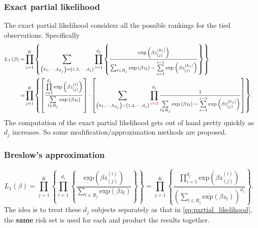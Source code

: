 \documentclass[a4paper,12pt]{article}
\begin{document}
\subsubsection{Exact partial likelihood}
\label{sec:exact-part-likel}

The exact partial likelihood considers all the possible rankings for the tied observations. Specifically
\begin{equation}
  \label{eq:exact_l1_with_ties}
  \footnotesize
  \begin{aligned}
    L_1\left(\beta\right)
    =& \prod\limits_{j = 1}^K
    \left\{
      \sum\limits_{
        \left(k_1, \cdots, k_{d_j}\right) = \left(1, 2, \cdots, d_j\right)
      }
      \prod\limits_{i = 1}^{d_j}\left\{
        \frac{
          \mathrm{exp}\left(\beta z_{\left(j\right)}^{\left(k_i\right)}\right)
        }{
          \sum_{l\in R_j}\mathrm{exp}\left(\beta z_l\right)
          - \sum\limits_{s = 1}^{i - 1}\mathrm{exp}\left(\beta z_{\left(j\right)}^{\left(k_s\right)}\right)
        }
      \right\}
    \right\}    \\
    =& \prod\limits_{j = 1}^{K}\left\{
      \left[
        \frac{
         \prod\limits_{i = 1}^{d_j}\mathrm{exp}\left(\beta z_{\left(j\right)}^{\left(i\right)}\right) 
       }{
         \sum\limits_{l\in R_j}\mathrm{exp}\left(\beta z_l\right)
       }        
     \right]
     \cdot
     \left[
       \sum\limits_{\left(k_1, \cdots, k_{d_j}\right) = \left(1, 2, \cdots, d_j\right)}
       \prod\limits_{{\color{red}i = 2}}^{d_j}\frac{1}{
         \sum\limits_{l\in R_j}\mathrm{exp}\left(\beta z_l\right)
         - \sum\limits_{s = 1}^{i - 1}
         \mathrm{exp}\left(\beta z_{\left(j\right)}^{\left(k_s\right)}\right)
       }
     \right]
    \right\}
    .
  \end{aligned}
\end{equation}
The computation of the exact partial likelihood gets out of hand pretty quickly as $d_j$ increases. So some modification/approximation methods are proposed.

\subsubsection{Breslow's approximation}
\label{sec:bresl-appr}

\begin{equation}
  \label{eq:breslow_l1}
  L_1\left(\beta\right) =
  \prod\limits_{j = 1}^K\left\{
    \prod\limits_{i = 1}^{d_j}\left\{
      \frac{\mathrm{exp}\left(\beta z_{\left(j\right)}^{\left(i\right)}\right)}{
        \sum\limits_{l\in R_j}\mathrm{exp}\left(\beta z_{l}\right)
      }
    \right\}
  \right\}
  = \prod\limits_{j = 1}^K\left\{
    \frac{\prod\limits_{i = 1}^{d_j}\mathrm{exp}\left(\beta z_{\left(j\right)}^{\left(i\right)}\right)}{
      \left(
        \sum\limits_{l\in R_j}\mathrm{exp}\left(\beta z_l\right)
      \right)^{d_j}
    }
  \right\}
  .
\end{equation}
The idea is to treat these $d_j$ subjects separately as that in \eqref{eq:partial_likelihood}, the \textbf{same} risk set is used for each and product the results together.
\end{document}
